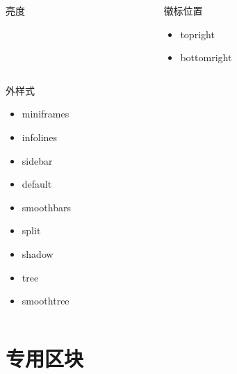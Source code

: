 \documentclass[
    aspectratio=169,  %
]{ctexbeamer}
\begin{document}
\begin{frame}
\begin{columns}[T]
\begin{column}{0.7\textwidth}
\begin{columns}[t]
\begin{column}{0.25\textwidth}
\begin{alertblock}{亮度}
\begin{itemize}
            \end{itemize}
          \end{alertblock}
        \end{column}
        \begin{column}{0.3\textwidth}
          \begin{alertblock}{徽标位置}
            \ttfamily
            \begin{itemize}
              \item topright
              \item bottomright
            \end{itemize}
          \end{alertblock}
        \end{column}
      \end{columns}
      \begin{alertblock}{外样式}
        \ttfamily
        \begin{multicols}{3}
          \begin{itemize}
            \item miniframes
            \item infolines
            \item sidebar
            \item default
            \item smoothbars
            \item split
            \item shadow
            \item tree
            \item smoothtree
          \end{itemize}
        \end{multicols}
      \end{alertblock}
    \end{column}
  \end{columns}
\end{frame}

\section{专用区块}
\end{document}
